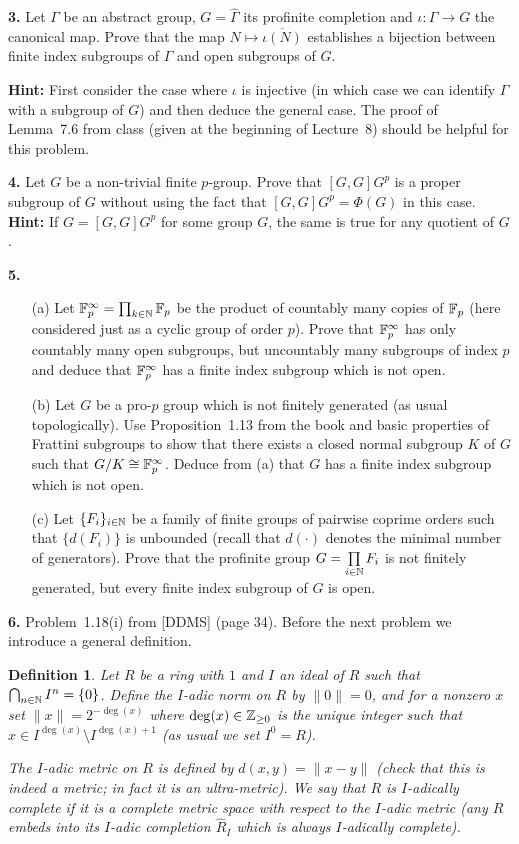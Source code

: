 \documentclass[12pt]{amsart}
\newtheorem* {Definition}    {Definition}
\begin{document}
{\bf 3.} Let $\Gamma$ be an abstract group, $G=\widehat\Gamma$ its profinite completion
 and $\iota:\Gamma\to G$ the canonical map. Prove that the map $N\mapsto \overline{\iota(N)}$
 establishes a bijection between finite index subgroups of $\Gamma$ and open subgroups of $G$.
 
 {\bf Hint:} First consider the case where $\iota$ is injective (in which case we can identify 
$\Gamma$ with a subgroup of $G$) and then deduce the general case. The proof of Lemma~7.6 from class
(given at the beginning of Lecture~8) should be helpful for this problem.

\skv
{\bf 4.} Let $G$ be a non-trivial finite $p$-group. Prove that $[G,G]G^p$ is a proper subgroup
of $G$ without using the fact that $[G,G]G^p=\Phi(G)$ in this case. {\bf Hint:} If
$G=[G,G]G^p$ for some group $G$, the same is true for any quotient of $G$.

\newpage
{\bf 5.} 
\begin{itemize}
\item[(a)] Let ${\mathbb F}_p^{\infty}=\prod_{k\in{\mathbb N}}{\mathbb F}_p$ be the product of countably many copies
of ${\mathbb F}_p$ (here considered just as a cyclic group of order $p$). Prove that ${\mathbb F}_p^{\infty}$
has only countably many open subgroups, but uncountably many subgroups of index $p$ and deduce that
${\mathbb F}_p^{\infty}$ has a finite index subgroup which is not open.
\item[(b)] Let $G$ be a pro-$p$ group which is not finitely generated (as usual topologically).
Use Proposition~1.13 from the book and basic properties of Frattini subgroups to show that
there exists a closed normal subgroup $K$ of $G$ such that $G/K\cong {\mathbb F}_p^{\infty}$. Deduce
from (a) that $G$ has a finite index subgroup which is not open.
\item[(c)] Let $\{F_i\}_{i\in{\mathbb N}}$ be a family of finite groups of pairwise coprime orders
such that $\{d(F_i)\}$ is unbounded (recall that $d(\cdot)$ denotes the minimal number of generators). Prove that the profinite group $G=\prod\limits_{i\in {\mathbb N}}F_i$ is not finitely generated,
but every finite index subgroup of $G$ is open.
\end{itemize}

\skv
{\bf 6.} Problem~1.18(i) from [DDMS] (page 34).
\skv
Before the next problem we introduce a general definition.

\begin{Definition}\rm Let $R$ be a ring with $1$ and $I$ an ideal of $R$ such that 
$\bigcap_{n\in{\mathbb N}}I^n=\{0\}$. Define the {\it $I$-adic norm} on $R$ by $\|0\|=0$,
and for a nonzero $x$ set $\|x\|=2^{-\deg(x)}$ where $\deg(x)\in{\mathbb Z}_{\geq 0}$ is the unique
integer such that $x\in I^{\deg(x)}\setminus I^{\deg(x)+1}$ (as usual we set $I^0=R$).

The {\it $I$-adic metric} on $R$ is defined by $d(x,y)=\|x-y\|$ (check that this is indeed a metric; in fact it is an ultra-metric). We say that $R$ is {\it $I$-adically complete} if it is a complete metric space with respect to 
the $I$-adic metric (any $R$ embeds into its $I$-adic completion $\widehat R_I$
which is always $I$-adically complete).
\end{Definition}
\end{document}
